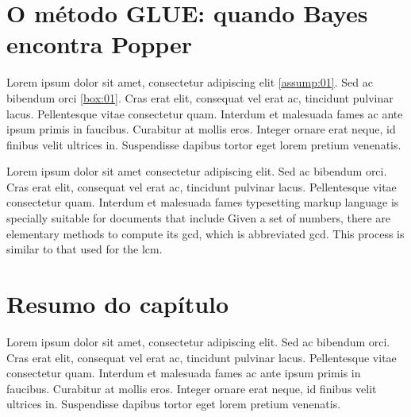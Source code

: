 \documentclass[./main.tex]{subfiles}
\begin{document}
\section{O método GLUE: quando Bayes encontra Popper}

\par Lorem ipsum dolor sit amet, consectetur adipiscing elit \ref{assump:01}. Sed ac bibendum orci \ref{box:01}. Cras erat elit, consequat vel erat ac, tincidunt pulvinar lacus. Pellentesque vitae consectetur quam. Interdum et malesuada fames ac ante ipsum primis in faucibus. Curabitur at mollis eros. Integer ornare erat neque, id finibus velit ultrices in. Suspendisse dapibus tortor eget lorem pretium venenatis.

\par Lorem ipsum dolor sit amet consectetur adipiscing elit. Sed ac bibendum orci. Cras \cite{popper2004logica} erat elit, consequat vel erat ac, tincidunt pulvinar lacus. Pellentesque vitae consectetur quam. Interdum et malesuada fames typesetting markup language is specially suitable for documents that include Given a set of numbers, there are elementary methods to compute its \acrlong{gcd}, which is abbreviated \acrshort{gcd}. This process is similar to that used for the \acrfull{lcm}.

\clearpage

\section{Resumo do capítulo}

\par Lorem ipsum dolor sit amet, consectetur adipiscing elit. Sed ac bibendum orci. Cras erat elit, consequat vel erat ac, tincidunt pulvinar lacus. Pellentesque vitae consectetur quam. Interdum et malesuada fames ac ante ipsum primis in faucibus. Curabitur at mollis eros. Integer ornare erat neque, id finibus velit ultrices in. Suspendisse dapibus tortor eget lorem pretium venenatis.
\end{document}
